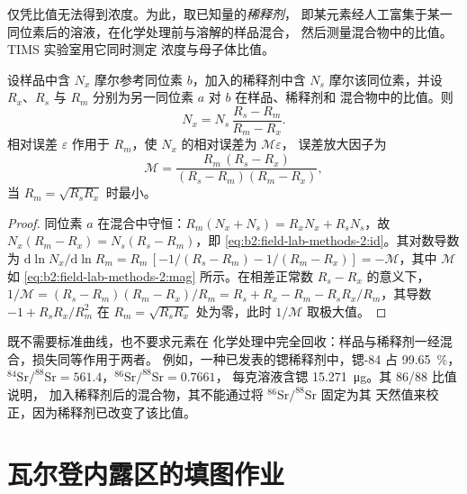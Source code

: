 仅凭比值无法得到浓度。为此，取已知量的\emph{稀释剂}，
即某元素经人工富集于某一同位素后的溶液，在化学处理前与溶解的样品混合，
然后测量混合物中的比值。TIMS 实验室用它同时测定
浓度与母子体比值。

\begin{proposition}[同位素稀释]\label{prop:b2:field-lab-methods-2:id}
设样品中含 $N_x$ 摩尔参考同位素 $b$，加入的稀释剂中含 $N_s$ 摩尔该同位素，并设
$R_x$、$R_s$ 与 $R_m$ 分别为另一同位素 $a$ 对 $b$ 在样品、稀释剂和
混合物中的比值。则
\begin{equation}
N_x = N_s\,\frac{R_s - R_m}{R_m - R_x} .
\label{eq:b2:field-lab-methods-2:id}
\end{equation}
相对误差 $\varepsilon$ 作用于 $R_m$，使 $N_x$ 的相对误差为 $\mathcal{M}\varepsilon$，
误差放大因子为
\begin{equation}
\mathcal{M} = \frac{R_m\,(R_s - R_x)}{(R_s - R_m)(R_m - R_x)} ,
\label{eq:b2:field-lab-methods-2:mag}
\end{equation}
当 $R_m = \sqrt{R_s R_x}$ 时最小。
\end{proposition}

\begin{proof}
同位素 $a$ 在混合中守恒：$R_m(N_x + N_s) = R_x N_x + R_s N_s$，故 $N_x(R_m - R_x) =
N_s(R_s - R_m)$，即 \eqref{eq:b2:field-lab-methods-2:id}。其对数导数为
$\mathrm{d}\ln N_x/\mathrm{d}\ln R_m = R_m\,[-1/(R_s - R_m) - 1/(R_m - R_x)] = -\mathcal{M}$，其中
$\mathcal{M}$ 如 \eqref{eq:b2:field-lab-methods-2:mag} 所示。在相差正常数 $R_s - R_x$ 的意义下，
$1/\mathcal{M} = (R_s - R_m)(R_m - R_x)/R_m = R_s + R_x - R_m - R_sR_x/R_m$，其导数
$-1 + R_sR_x/R_m^2$ 在 $R_m = \sqrt{R_sR_x}$ 处为零，此时 $1/\mathcal{M}$ 取极大值。
\end{proof}

既不需要标准曲线，也不要求元素在
化学处理中完全回收：样品与稀释剂一经混合，损失同等作用于两者。
例如，一种已发表的锶稀释剂中，锶-84 占 \qty{99.65}{\percent}，
$^{84}\mathrm{Sr}/^{88}\mathrm{Sr} = 561.4$，$^{86}\mathrm{Sr}/^{88}\mathrm{Sr} = 0.7661$，
每克溶液含锶 \qty{15.271}{\micro\gram}。其 86/88 比值说明，
加入稀释剂后的混合物，其不能通过将 $^{86}\mathrm{Sr}/^{88}\mathrm{Sr}$ 固定为其
天然值来校正，因为稀释剂已改变了该比值。

\section{瓦尔登内露区的填图作业}\label{sec:b2:field-lab-methods-2:campaign}

